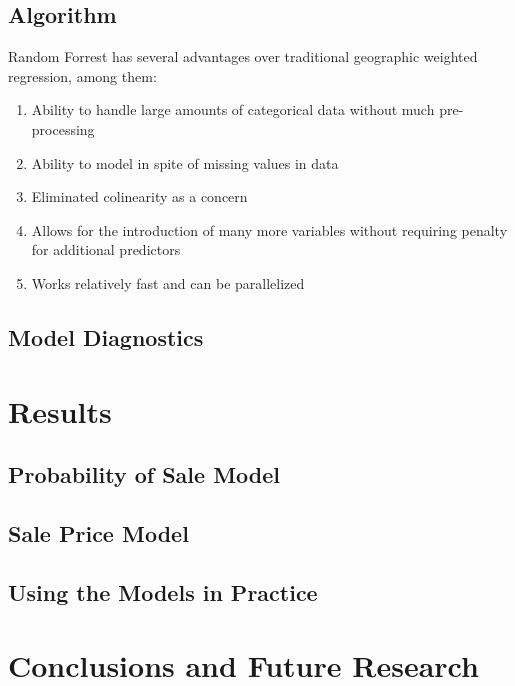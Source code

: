 \documentclass[]{article}
\providecommand{\tightlist}{%
  \setlength{\itemsep}{0pt}\setlength{\parskip}{0pt}}
\begin{document}
\subsection{Algorithm}\label{algorithm}

Random Forrest has several advantages over traditional geographic
weighted regression, among them:

\begin{enumerate}
\def\labelenumi{\arabic{enumi}.}
\tightlist
\item
  Ability to handle large amounts of categorical data without much
  pre-processing
\item
  Ability to model in spite of missing values in data
\item
  Eliminated colinearity as a concern
\item
  Allows for the introduction of many more variables without requiring
  penalty for additional predictors
\item
  Works relatively fast and can be parallelized
\end{enumerate}

\subsection{Model Diagnostics}\label{model-diagnostics}

\section{Results}\label{results}

\subsection{Probability of Sale Model}\label{probability-of-sale-model}

\subsection{Sale Price Model}\label{sale-price-model}

\subsection{Using the Models in
Practice}\label{using-the-models-in-practice}

\section{Conclusions and Future
Research}\label{conclusions-and-future-research}
\end{document}

